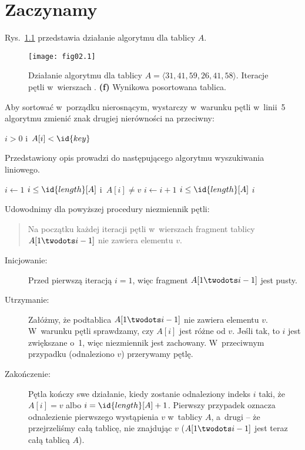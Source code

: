 \chapter{Zaczynamy}


\exercise %
Rys.~\ref{fig:2.1-1} przedstawia działanie algorytmu  dla tablicy $A$.
\begin{figure}[ht]
	\begin{center}
		\texttt{[image: fig02.1]}
	\end{center}
	\caption{Działanie algorytmu  dla tablicy $A=\langle31,41,59,26,41,58\rangle$. {\sffamily\bfseries{}} Iteracje pętli  w~wierszach . {\sffamily\bfseries(f)} Wynikowa posortowana tablica.} \label{fig:2.1-1}
\end{figure}

\exercise %
Aby sortować w~porządku nierosnącym, wystarczy w~warunku pętli  w~linii~5 algorytmu  zmienić znak drugiej nierówności na przeciwny:
\begin{codebox}
\setcounter{codelinenumber}{4}
\li	\While $i>0$ i~$A[i]<\id{key}$
\end{codebox}

\exercise %
Przedstawiony opis prowadzi do następującego algorytmu wyszukiwania liniowego.
\begin{codebox}
\li	$i\gets1$
\li	\While $i\le\id{length}[A]$ i~$A[i]\ne v$ \label{li:linear-search-while-begin}
\li		\Do $i\gets i+1$
		\End \label{li:linear-search-while-end}
\li	\If $i\le\id{length}[A]$
\li		\Then \Return $i$
		\End
\li	\Return {}
\end{codebox}

Udowodnimy dla powyższej procedury niezmiennik pętli:
\begin{quote}
Na początku każdej iteracji pętli  w~wierszach \twodashes{\ref{li:linear-search-while-begin}}{\ref{li:linear-search-while-end}} fragment tablicy $A[1\twodots i-1]$ nie zawiera elementu $v$.
\end{quote}
\begin{description}
	\item[Inicjowanie:] Przed pierwszą iteracją $i=1$, więc fragment $A[1\twodots i-1]$ jest pusty.
	\item[Utrzymanie:] Załóżmy, że podtablica $A[1\twodots i-1]$ nie zawiera elementu $v$. W~warunku pętli  sprawdzamy, czy $A[i]$ jest różne od $v$. Jeśli tak, to $i$ jest zwiększane o~1, więc niezmiennik jest zachowany. W~przeciwnym przypadku (odnaleziono $v$) przerywamy pętlę.
	\item[Zakończenie:] Pętla kończy swe działanie, kiedy zostanie odnaleziony indeks $i$ taki, że $A[i]=v$ albo $i=\id{length}[A]+1$. Pierwszy przypadek oznacza odnalezienie pierwszego wystąpienia $v$ w~tablicy $A$, a~drugi -- że przejrzeliśmy całą tablicę, nie znajdując $v$ ($A[1\twodots i-1]$ jest teraz całą tablicą $A$).
\end{description}

